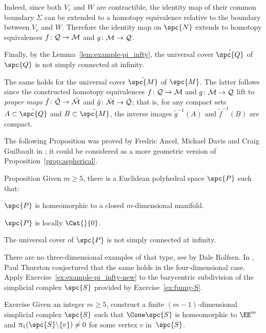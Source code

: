 Indeed, since both $V_v$ and $W$ are contractible, the identity map of  their common boundary $\Sigma$ can be extended to a homotopy equivalence relative to the boundary between $V_v$ and $W$.
Therefore the identity map on $\spc{N}$ extends to homotopy equivalences 
$f\: \spc Q\to \spc M$ and $g\:\spc M\to \spc Q$.

Finally, by the Lemma~\ref{lem:example-pi_infty},  
the universal cover $\tilde{\spc{Q}}$ of $\spc{Q}$
is not simply connected at infinity.

The same holds for 
the universal cover $\tilde{\spc{M}}$ of $\spc{M}$.
The latter follows since the constructed homotopy equivalences 
$f\: \spc Q\to \spc M$ and $g\:\spc M\to \spc Q$ 
lift to {}\emph{proper maps} 
$\tilde f \: \tilde{\spc{Q}}\to \tilde{\spc{M}}$
and $\tilde g \: \tilde{\spc{M}}\to \tilde{\spc{Q}}$;
that is, for any compact sets $A\subset \tilde{\spc{Q}}$ and $B\subset\tilde{\spc{M}}$, the inverse images $\tilde g^{-1}(A)$ and $\tilde f^{-1}(B)$ are compact.
\qeds


The following Proposition was proved by Fredric Ancel, 
Michael Davis and Craig Guilbault in \cite{ADG};
it could be considered as a more geometric version of Proposition~\ref{prop:aspherical}.


\begin{thm}{Proposition}\label{prop:loc-CAT-mnfld}
Given $m\ge 5$, there is a Euclidean polyhedral space $\spc{P}$ such that:
\begin{subthm}{}
$\spc{P}$ is homeomorphic to a closed $m$-dimensional manifold.
\end{subthm}

\begin{subthm}{}
$\spc{P}$ is locally $\Cat{}{0}$.
\end{subthm}

\begin{subthm}{}
The universal cover of $\spc{P}$ is not simply connected at infinity.
\end{subthm}
\end{thm}

There are no three-dimensional examples of that type, see \cite{rolfsen} by Dale Rolfsen.
In \cite{thurston}, Paul Thurston conjectured that the same holds in the four-dimensional case.
Apply Exercise~\ref{ex:example-pi_infty-new} to the barycentric subdivision of the simplicial complex $\spc{S}$ provided by Exercise~\ref{ex:funny-S}.
\qeds

\begin{thm}{Exercise}\label{ex:funny-S}
Given an integer $m\ge 5$,
construct a finite $(m-1)$-dimensional simplicial complex $\spc{S}$ such that $\Cone\spc{S}$ is homeomorphic to $\EE^m$
and $\pi_1(\spc{S}\backslash\{v\})\ne0$ for some vertex $v$ in~$\spc{S}$.
\end{thm} 


